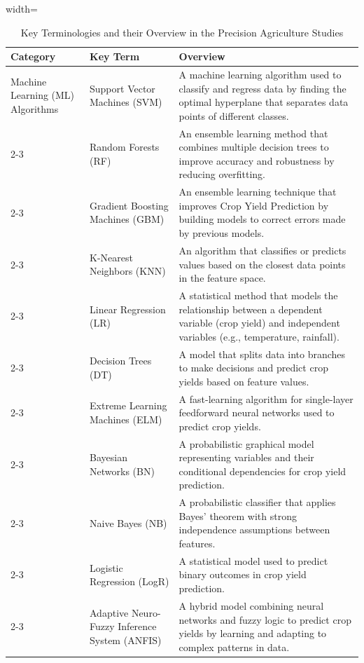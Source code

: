 \documentclass[conference]{IEEEtran}
\begin{document}
\begin{table}[htbp]
\centering
\caption{Key Terminologies and their Overview in the Precision Agriculture Studies}
\begin{adjustbox}{width=\textwidth}
\begin{tabular}{|p{3cm}|p{4cm}|p{7cm}|}
\hline
\textbf{Category} & \textbf{Key Term} & \textbf{Overview} \\
\hline
Machine Learning (ML) Algorithms 
& Support Vector Machines (SVM) & A machine learning algorithm used to classify and regress data by finding the optimal hyperplane that separates data points of different classes. \\
\cline{2-3}
& Random Forests (RF) & An ensemble learning method that combines multiple decision trees to improve accuracy and robustness by reducing overfitting. \\
\cline{2-3}
& Gradient Boosting Machines (GBM) & An ensemble learning technique that improves Crop Yield Prediction by building models to correct errors made by previous models. \\
\cline{2-3}
& K-Nearest Neighbors (KNN) & An algorithm that classifies or predicts values based on the closest data points in the feature space. \\
\cline{2-3}
& Linear Regression (LR) & A statistical method that models the relationship between a dependent variable (crop yield) and independent variables (e.g., temperature, rainfall). \\
\cline{2-3}
& Decision Trees (DT) & A model that splits data into branches to make decisions and predict crop yields based on feature values. \\
\cline{2-3}
& Extreme Learning Machines (ELM) & A fast-learning algorithm for single-layer feedforward neural networks used to predict crop yields. \\
\cline{2-3}
& Bayesian Networks (BN) & A probabilistic graphical model representing variables and their conditional dependencies for crop yield prediction. \\
\cline{2-3}
& Naive Bayes (NB) & A probabilistic classifier that applies Bayes' theorem with strong independence assumptions between features. \\
\cline{2-3}
& Logistic Regression (LogR) & A statistical model used to predict binary outcomes in crop yield prediction. \\
\cline{2-3}
& Adaptive Neuro-Fuzzy Inference System (ANFIS) & A hybrid model combining neural networks and fuzzy logic to predict crop yields by learning and adapting to complex patterns in data. \\

\end{tabular}
\end{adjustbox}
\end{table}
\end{document}
